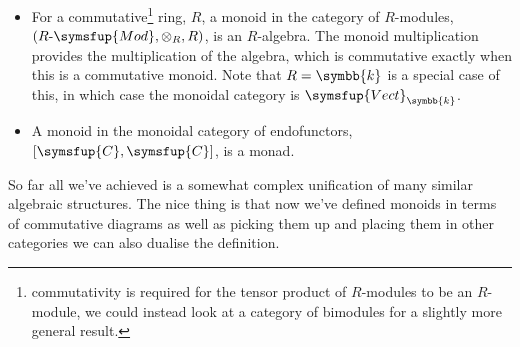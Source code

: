\documentclass[fleqn]{NotesClass}
\makeatletter
\newcommand{\cat}[1]{\symsfup{#1}}
\newcommand{\c@egory}[1]{\symsfup{#1}}
\newcommand{\Vect}[1][\field]{\c@egory{Vect}_{#1}}
\newcommand{\RMod}[1][R]{#1\text{-}\c@egory{Mod}}
\renewcommand{\field}{\symbb{k}}
\makeatother
\begin{document}
\begin{exm}{}{}
\begin{itemize}
            \item For a commutative\footnote{commutativity is required for the tensor product of \(R\)-modules to be an \(R\)-module, we could instead look at a category of bimodules for a slightly more general result.} ring, \(R\), a monoid in the category of \(R\)-modules, \((\RMod, \otimes_{R}, R)\), is an \(R\)-algebra.
            The monoid multiplication provides the multiplication of the algebra, which is commutative exactly when this is a commutative monoid.
            Note that \(R = \field\) is a special case of this, in which case the monoidal category is \(\Vect\).
            
            \item A monoid in the monoidal category of endofunctors, \([\cat{C}, \cat{C}]\), is a monad.
        \end{itemize}
    \end{exm}
    
    So far all we've achieved is a somewhat complex unification of many similar algebraic structures.
    The nice thing is that now we've defined monoids in terms of commutative diagrams as well as picking them up and placing them in other categories we can also dualise the definition.
    
\end{document}
